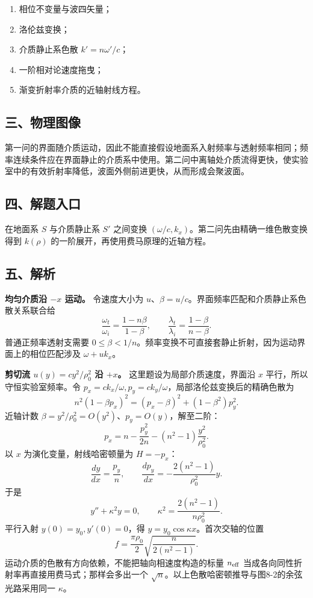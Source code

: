 \documentclass[12pt,a4paper,UTF8]{ctexart}
\newcommand{\tightlist}{\setlength{\itemsep}{0pt}\setlength{\parskip}{0pt}}
\begin{document}
\begin{enumerate}
\def\labelenumi{\arabic{enumi}.}
\tightlist
\item
  相位不变量与波四矢量；
\item
  洛伦兹变换；
\item
  介质静止系色散 \(k'=n\omega'/c\)；
\item
  一阶相对论速度拖曳；
\item
  渐变折射率介质的近轴射线方程。
\end{enumerate}

\subsection{三、物理图像}\label{ux4e09ux7269ux7406ux56feux50cf-7}

第一问的界面随介质运动，因此不能直接假设地面系入射频率与透射频率相同；频率连续条件应在界面静止的介质系中使用。第二问中离轴处介质流得更快，使实验室中的有效折射率降低，波面外侧前进更快，从而形成会聚波面。

\subsection{四、解题入口}\label{ux56dbux89e3ux9898ux5165ux53e3-7}

在地面系 \(S\) 与介质静止系 \(S'\) 之间变换
\((\omega/c,k_x)\)。第二问先由精确一维色散变换得到 \(k(\rho)\)
的一阶展开，再使用费马原理的近轴方程。

\subsection{五、解析}\label{ux4e94ux89e3ux6790-7}

\textbf{均匀介质沿 \(-x\) 运动。} 令速度大小为
\(u\)、\(\beta=u/c\)。界面频率匹配和介质静止系色散关系联合给 \[
\boxed{\frac{\omega_t}{\omega_i}=\frac{1-n\beta}{1-\beta}},
\qquad
\boxed{\frac{\lambda_t}{\lambda_i}=\frac{1-\beta}{n-\beta}}.
\] 普通正频率透射支需要
\(0\le\beta<1/n\)。频率变换不可直接套静止折射，因为运动界面上的相位匹配涉及
\(\omega+uk_x\)。

\textbf{剪切流 \(u(y)=cy^2/\rho_0^2\) 沿 \(+x\)。}
这里题设为局部介质速度，界面沿 \(x\) 平行，所以守恒实验室频率。令
\(p_x=ck_x/\omega,p_y=ck_y/\omega\)，局部洛伦兹变换后的精确色散为 \[
n^2(1-\beta p_x)^2=(p_x-\beta)^2+(1-\beta^2)p_y^2.
\] 近轴计数 \(\beta=y^2/\rho_0^2=O(y^2)\)、\(p_y=O(y)\)，解至二阶： \[
p_x=n-\frac{p_y^2}{2n}-(n^2-1)\frac{y^2}{\rho_0^2}.
\] 以 \(x\) 为演化变量，射线哈密顿量为 \(H=-p_x\)： \[
\frac{dy}{dx}=\frac{p_y}{n},\qquad
\frac{dp_y}{dx}=-\frac{2(n^2-1)}{\rho_0^2}y.
\] 于是 \[
y''+\kappa^2y=0,\qquad
\kappa^2=\frac{2(n^2-1)}{n\rho_0^2}.
\] 平行入射 \(y(0)=y_0,y'(0)=0\)，得
\(y=y_0\cos\kappa x\)。首次交轴的位置 \[
\boxed{f=\frac{\pi\rho_0}{2}\sqrt{\frac{n}{2(n^2-1)}}}.
\] 运动介质的色散有方向依赖，不能把轴向相速度构造的标量 \(n_{\rm eff}\)
当成各向同性折射率再直接用费马式；那样会多出一个
\(\sqrt n\)。以上色散哈密顿推导与图8-2的余弦光路采用同一 \(\kappa\)。
\end{document}
